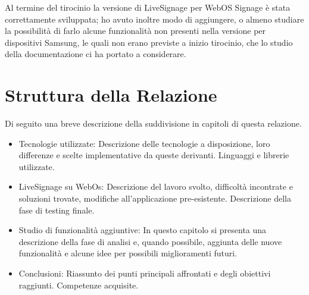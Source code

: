 Al termine del tirocinio la versione di LiveSignage per WebOS Signage è stata correttamente sviluppata; ho avuto inoltre modo di aggiungere, o almeno studiare la possibilità di farlo alcune funzionalità non presenti nella versione per dispositivi Samsung, le quali non erano previste a inizio tirocinio, che lo studio della documentazione ci ha portato a considerare.

\section{Struttura della Relazione}
Di seguito una breve descrizione della suddivisione in capitoli di questa relazione.
\begin{itemize}
    \item Tecnologie utilizzate: Descrizione delle tecnologie a disposizione, loro differenze e scelte implementative da queste derivanti. Linguaggi e librerie utilizzate.
    \item LiveSignage su WebOs: Descrizione del lavoro svolto, difficoltà incontrate e soluzioni trovate, modifiche all'applicazione pre-esistente. Descrizione della fase di testing finale.
    \item Studio di funzionalità aggiuntive: In questo capitolo si presenta una descrizione della fase di analisi e, quando possibile, aggiunta delle nuove funzionalità e alcune idee per possibili miglioramenti futuri.
    \item Conclusioni: Riassunto dei punti principali affrontati e degli obiettivi raggiunti. Competenze acquisite.
\end{itemize}